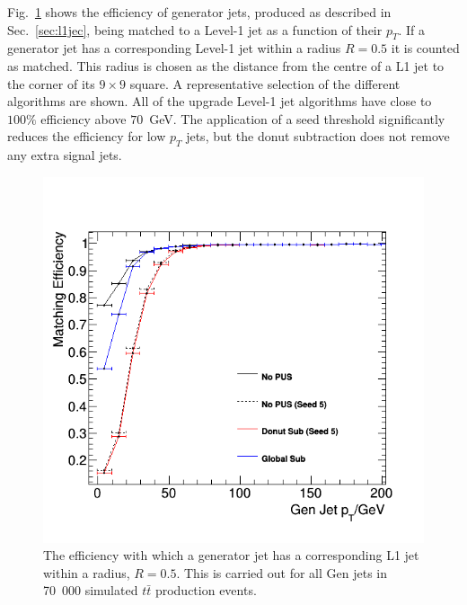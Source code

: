 Fig.~\ref{fig:matchingeff} shows the efficiency of generator jets,
produced as described in Sec.~\ref{sec:l1jec}, being matched to a
Level-1 jet as a function of their $p_T$. If a generator jet has a
corresponding Level-1 jet within a radius $R=0.5$ it is counted as
matched.
This radius is chosen as the distance from the centre of a L1 jet to
the corner of its $9\times9$ square. A representative selection of the
different \PUS algorithms are shown. All of the upgrade Level-1 jet
algorithms have close to $100\%$ efficiency above $70$~GeV. The
application of a seed threshold significantly reduces the efficiency
for low $p_T$ jets, but the donut subtraction does not remove any
extra signal jets.
\begin{figure}
	\begin{center}
		\includegraphics[width=0.6\linewidth]{figs/trigger/performance/matchingeff_alljet}
	\end{center}
	\caption{The efficiency with which a generator jet has a
  corresponding L1 jet within a radius, $R=0.5$. This is carried out
  for all Gen jets in 70~000 simulated $t\bar{t}$ production events.}
	\label{fig:matchingeff}
\end{figure}

